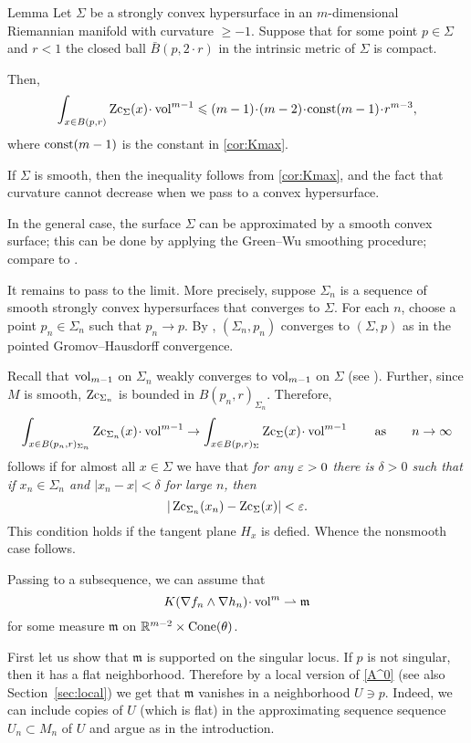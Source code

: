 \begin{thm}{Lemma}\label{lem:nonsmooth-convex}
Let $\Sigma$ be a strongly convex hypersurface in an $m$-dimensional Riemannian manifold with curvature $\ge -1$.
Suppose that for some point $p\in \Sigma$ and $r<1$ the closed ball $\bar B(p,2\cdot r)$ in the intrinsic metric of $\Sigma$ is compact.

Then, 
\[\int_{x\in B(p,r)}\Zc_\Sigma(x)\cdot \vol^{m-1}\le (m-1)\cdot(m-2)\cdot\const(m-1)\cdot r^{m-3},\]
where $\mathrm{const}(m-1)$ is the constant in \ref{cor:Kmax}.
\end{thm}

 If $\Sigma$ is smooth, then the inequality follows from \ref{cor:Kmax}, and the fact that curvature cannot decrease when we pass to a convex hypersurface.

In the general case, the surface $\Sigma$ can be approximated by a smooth convex surface;
this can be done by applying the Green--Wu smoothing procedure; compare to \cite{AKP-buyalo}.

It remains to pass to the limit.
More precisely, suppose $\Sigma_n$ is a sequence of smooth  strongly convex hypersurfaces that converges to $\Sigma$.
For each $n$, choose a point $p_n\in\Sigma_n$ such that $p_n\to p$. 
By \cite[Theorem 1.2]{petrunin-QG}, $(\Sigma_n,p_n)$ converges to $(\Sigma,p)$ as in the pointed Gromov--Hausdorff convergence.

Recall that $\operatorname{vol}_{m-1}$ on $\Sigma_n$ weakly converges to $\operatorname{vol}_{m-1}$ on $\Sigma$ (see \cite[10.8]{BGP}).
Further, since $M$ is smooth, $\operatorname{\rm Zc}_{\Sigma_n}$ is bounded in $B(p_n,r)_{\Sigma_n}$.
Therefore, 
\[\int_{x\in B(p_n,r)_{\Sigma_n}}\Zc_{\Sigma_n}(x)\cdot \vol^{m-1}\to \int_{x\in B(p,r)_{\Sigma}}\Zc_{\Sigma}(x)\cdot \vol^{m-1}\qquad\text{as}\qquad n\to\infty\]
follows if for almost all $x\in \Sigma$ we have that
\textit{for any $\varepsilon>0$ there is $\delta>0$ such that
if $x_n\in \Sigma_n$ and $|x_n-x|<\delta$ for large $n$,
then}
\[|\operatorname{\rm Zc}_{\Sigma_n}(x_n)-\operatorname{\rm Zc}_{\Sigma}(x)|<\varepsilon.\]
This condition holds if the tangent plane $H_x$ is defied.
Whence the nonsmooth case follows.
\qeds

Passing to a subsequence, we can assume that
\[K(\nabla f_n\wedge\nabla h_n)\cdot\vol^m \rightharpoonup\mathfrak m\]
for some measure $\mathfrak m$ on $\mathbb{R}^{m-2}\times \operatorname{Cone}(\theta)$.

First let us show that $\mathfrak m$ is supported on the singular locus.
If $p$ is not singular, then it has a flat neighborhood.
Therefore by a local version of \ref{A^0} (see also Section~\ref{sec:local})
we get that $\mathfrak m$ vanishes in a neighborhood $U\ni p$.
Indeed, we can include copies of $U$ (which is flat) in the approximating sequence sequence $U_n\subset M_n$ of $U$ and argue as in the introduction.


